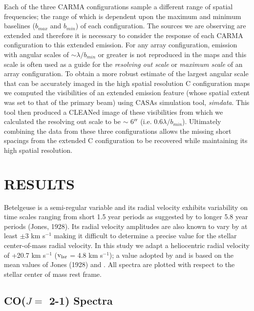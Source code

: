 \documentclass[iop]{emulateapj}
\begin{document}
Each of the three CARMA configurations sample a different range of spatial frequencies; the range of which is dependent upon the maximum and minimum baselines ($b_{max}$ and $b_{min}$) of each configuration. The sources we are observing are extended and therefore it is necessary to consider the response of each CARMA configuration to this extended emission. For any array configuration, emission with angular scales of $\sim \lambda/b_{min}$ or greater is not reproduced in the maps \citep{1999ASPC..180.....T} and this scale is often used as a guide for the \textit{resolving out scale} or \textit{maximum scale} of an array configuration. To obtain a more robust estimate of the largest angular scale that can be accurately imaged in the high spatial resolution C configuration maps we computed the visibilities of an extended emission feature (whose spatial extent was set to that of the primary beam) using CASAs simulation tool, \textit{simdata}. This tool then produced a CLEANed image of these visibilities from which we calculated the resolving out scale to be $\sim$ 6$\mbox{$^{\prime\prime}$}$ 
(i.e. $0.6\lambda/b_{min}$). Ultimately combining the data from these three configurations allows the missing short spacings from the extended C configuration to be recovered while maintaining its high spatial resolution.

\section{RESULTS} 

Betelgeuse is a  semi-regular variable and its radial velocity exhibits variability on time scales ranging from short 1.5 year periods as suggested by \cite{1931PWasO..15..178S} to longer 5.8 year periods (Jones, 1928). Its radial velocity amplitudes are also known to vary by at least $\pm$3 km s${}^{-1}$ \citep{1989AJ.....98.2233S} making it difficult to determine a precise value for the stellar center-of-mass radial velocity. In this study we adapt a heliocentric radial velocity of +20.7 km s${}^{-1}$ ($\rm{v_{lsr}}$ = 4.8 km s$^{-1}$); a value adopted by \citet{2008AJ....135.1430H} and is based on the mean values of Jones (1928) and \cite{1933CMWCI.464....1S}. All spectra are plotted with respect to the stellar center of mass rest frame.

\subsection{CO($J=$ 2-1) Spectra} \label{results1} %
\end{document}
